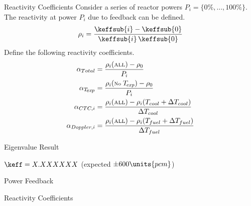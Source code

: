 \begin{frame}{Reactivity Coefficients}
  Consider a series of reactor powers $P_i = \{0\%,\ldots,100\%\}$. The
  reactivity at power $P_i$ due to feedback can be defined.
  \begin{equation}
    \rho_i = \frac{\keffsub{i} - \keffsub{0}}{\keffsub{i} \, \keffsub{0}}
  \end{equation}
  Define the following reactivity coefficients.
  \begin{align}
    \alpha_{Total} &= \frac{\rho_i(\text{\scriptsize ALL})-
      \rho_0}{P_i} \\
    \alpha_{T_{\!\mbox{\scriptsize \em exp}}} &= \frac{\rho_i(\text{\scriptsize 
      No } T_{\!\mbox{\scriptsize \em exp}} )-
      \rho_0}{P_i} \\
    \alpha_{CTC,i} &= \frac{\rho_i(\text{\scriptsize ALL}) - 
      \rho_i(T_{cool}+\Delta T_{cool})}{\Delta T_{cool}} \\
    \alpha_{Doppler,i} &= \frac{\rho_i(\text{\scriptsize ALL}) - 
      \rho_i(T_{fuel}+\Delta T_{fuel})}{\Delta T_{fuel}}
  \end{align}
\end{frame}

\begin{frame}{Eigenvalue Result}
  \vspace{-0.25in}
  \begin{figure}
    \centering
    \hspace{1in}
  \end{figure}
  \begin{block}{}
    $\keff = X.XXXXXX$ \qquad (expected $\pm 600\units{pcm}$)
  \end{block}
\end{frame}

\begin{frame}{Power Feedback}
  \begin{figure}
    \centering
    \hspace*{\fill}
  \end{figure}
\end{frame}

\begin{frame}{Reactivity Coefficients}
  \begin{figure}
    \centering
    \hspace*{\fill}
  \end{figure}
\end{frame}
